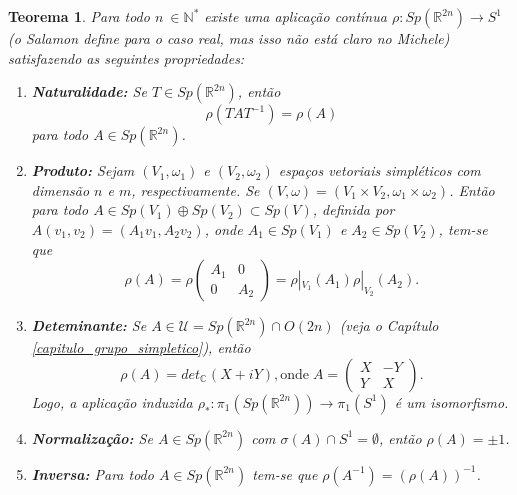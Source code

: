 \documentclass[12pt]{book}
\newtheorem{teorema}{Teorema}[section]
\newcommand{\circulo}{S^{1}}
\newcommand{\complexo}[1]{\mathbb{C}^{#1}}
\newcommand{\grupofundamental}[1]{\pi_{1}(#1)}
\newcommand{\gruposimpletico}[1]{Sp(#1)}
\newcommand{\matrizortogonal}[1]{O(#1)}
\newcommand{\matrizSimpleticaOrtogonal}{\mathcal{U}}
\newcommand{\real}[1]{\mathbb{R}^{#1}}
\newcommand{\alerta}[1]{{\color{red}#1}}
\begin{document}
	\begin{teorema}\label{teorema_aplicacao_rho}
		Para todo $n\ \in \mathbb{N}^{*}$ existe uma aplicação contínua $\rho:\gruposimpletico{\real{2n}} \to S^{1}$ \alerta{(o Salamon define para o caso real, mas isso não está claro no Michele)} satisfazendo as seguintes propriedades:
		\begin{enumerate}
			\item \label{item_naturalidade_rho} \textbf{Naturalidade:}  Se $T\in \gruposimpletico{\real{2n}}$, então 
			$$
			\rho(TAT^{-1}) = \rho(A)
			$$
			para todo $A\in \gruposimpletico{\real{2n}}$.
			
			\item \label{item_produto_rho} \textbf{Produto:} Sejam $(V_{1}, \omega_{1})$ e $(V_{2}, \omega_{2})$ espaços vetoriais simpléticos com dimensão $n$ e $m$, respectivamente. Se $(V,\omega) = (V_{1}\times V_{2},\omega_{1}\times \omega_{2})$. Então para todo $A \in \gruposimpletico{V_{1}}\oplus\gruposimpletico{V_{2}} \subset \gruposimpletico{V}$,  definida por $A(v_{1}, v_{2})=(A_{1}v_{1}, A_{2}v_{2})$, onde $A_{1} \in \gruposimpletico{V_{1}}$ e $A_{2} \in \gruposimpletico{V_{2}}$, tem-se que
			$$
			\rho(A) = \rho 
			\left(
			\begin{array}{cc}
			A_{1} & 0
			\\
			0 & A_{2}
			\end{array} 
			\right)
			= \rho|_{V_{1}}(A_{1})\rho|_{V_{2}}(A_{2}).
			$$
			
			\item \label{item_determinante_rho} \textbf{Deteminante:} Se $A\in \matrizSimpleticaOrtogonal= \gruposimpletico{\real{2n}}\cap \matrizortogonal{2n}$ (veja o Capítulo \ref{capitulo_grupo_simpletico}), então 
			$$
			\rho(A) = det_{\complexo{}}(X+iY), \text{onde} \;	
			A=\left(
			\begin{array}{cc}
			X & -Y					\\
			Y & X
			\end{array}
			\right).
			$$
			Logo, a aplicação induzida $\rho_{*}: \grupofundamental{\gruposimpletico{\real{2n}}} \to \grupofundamental{\circulo}$ é um isomorfismo.
			
			\item \label{item_normalizacao_rho} \textbf{Normalização:} Se $A \in \gruposimpletico{\real{2n}}$ com $\sigma(A)\cap \circulo = \emptyset$, então $\rho(A) = \pm 1$.
			
			\item \label{item_inversa_rho} \textbf{Inversa:} Para todo $A \in \gruposimpletico{\real{2n}}$ tem-se que $\rho(A^{-1})=(\rho(A))^{-1}$. 
		\end{enumerate}
	\end{teorema}
	
\end{document}
